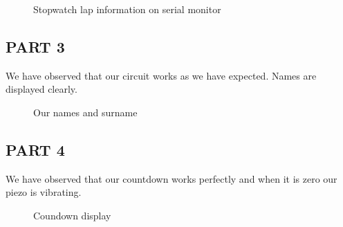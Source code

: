 \documentclass[pdftex,12pt,a4paper]{article}
\begin{document}
\begin{figure}[H]
    \centering
    \centering
    \caption{Stopwatch lap information on serial monitor}
    \label{fig:part2-right-simulation2}
\end{figure}


\newpage{}
\begin{flushleft}
\subsection{PART 3}
We have observed that our circuit works as we have expected. Names are displayed clearly.
\begin{figure}[H]
    \centering
    \centering
    \caption{Our names and surname}
    \label{fig:Our names and surname}
\end{figure}

\end{flushleft}

\newpage{}
\begin{flushleft}
\subsection{PART 4}
We have observed that our countdown works perfectly and when it is zero our piezo is vibrating.
\begin{figure}[H]
    \centering
    \centering
    \caption{Coundown display}
    \label{fig:right player win simulation}
\end{figure}

\end{flushleft}
\end{document}
